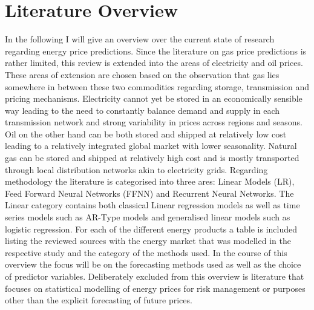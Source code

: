 \section{Literature Overview} \label{sec:Literature}
In the following I will give an overview over the current state of research regarding energy price predictions. Since the literature on gas price predictions is rather limited, this review is extended into the areas of electricity and oil prices. 
These areas of extension are chosen based on the observation that gas lies somewhere in between these two commodities regarding storage, transmission and pricing mechanisms. Electricity cannot yet be stored in an economically sensible way leading to the need to constantly balance demand and supply in each transmission network and strong variability in prices across regions and seasons. Oil on the other hand can be both stored and shipped at relatively low cost leading to a relatively integrated global market with lower seasonality. Natural gas can be stored and shipped at relatively high cost and is mostly transported through local distribution networks akin to electricity grids. Regarding methodology the literature is categorised into three ares: Linear Models (LR), Feed Forward Neural Networks (FFNN) and Recurrent Neural Networks. The Linear category contains both classical Linear regression models as well as time series models such as AR-Type models and generalised linear models such as logistic regression. For each of the different energy products a table is included listing the reviewed sources with the energy market that was modelled in the respective study and the category of the methods used. In the course of this overview the focus will be on the forecasting methods used as well as the choice of predictor variables. Deliberately excluded from this overview is literature that focuses on statistical modelling of energy prices for risk management or purposes other than the explicit forecasting of future prices.

